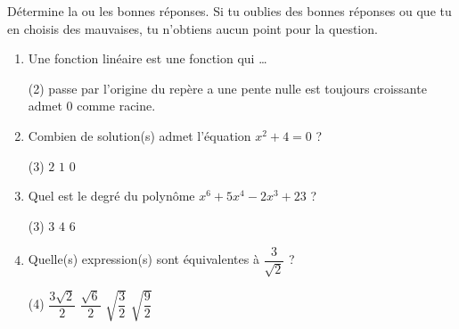 \documentclass[a4paper, 12pt, parskip=half-, twoside=semi]{scrartcl}
\begin{document}
\begin{connaitre}[points=4]
    Détermine la ou les bonnes réponses. Si tu oublies des bonnes réponses ou que tu en choisis des mauvaises, tu n'obtiens aucun point pour la question.
    \begin{enumerate}
        \item Une fonction linéaire est une fonction qui \dots
              \begin{QCM}(2)
                  \choice passe par l'origine du repère
                  \choice a une pente nulle
                  \choice est toujours croissante
                  \choice admet $0$ comme racine.
              \end{QCM}
        \item Combien de solution(s) admet l'équation $x^2+4=0$ ?
              \begin{QCM}(3)
                  \choice $2$
                  \choice $1$
                  \choice $0$
              \end{QCM}
        \item Quel est le degré du polynôme $x^6 + 5x^4 -2x^3 +23$ ?
              \begin{QCM}(3)
                  \choice $3$
                  \choice $4$
                  \choice $6$
              \end{QCM}
        \item Quelle(s) expression(s) sont équivalentes à $\dfrac{3}{\sqrt{2}}$ ?
              \begin{QCM}(4)
                  \choice $\dfrac{3\sqrt{2}}{2}$
                  \choice $\dfrac{\sqrt{6}}{2}$
                  \choice $\sqrt{\dfrac{3}{2}}$
                  \choice $\sqrt{\dfrac{9}{2}}$
              \end{QCM}
    \end{enumerate}
\end{connaitre}
\end{document}
